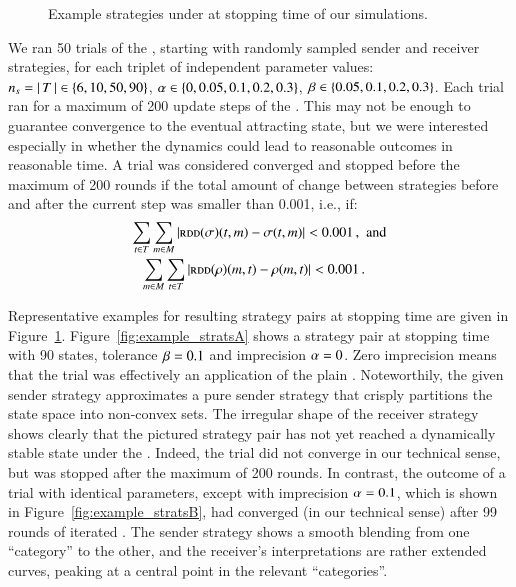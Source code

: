 \begin{figure}


  \caption{Example strategies under \rdd at stopping time of our simulations.}
  \label{fig:example_strats}
\end{figure}

We ran 50 trials of the \rdd, starting with randomly sampled sender
and receiver strategies, for each triplet of independent parameter
values: $n_s = \left \lvert \, T \, \right\rvert \in \left\{6, 10, 50, 90\right\}$, $\alpha \in
\left\{0, 0.05, 0.1, 0.2, 0.3\right\}$, $\beta \in \left\{0.05, 0.1, 0.2,
  0.3\right\}$. Each trial ran for a maximum of 200 update steps of the
\rdd. This may not be enough to guarantee convergence to the eventual
attracting state, but we were interested especially in whether the
dynamics could lead to reasonable outcomes in reasonable time. A trial
was considered converged and stopped before the maximum of 200 rounds
if the total amount of change between strategies before and after the
current \rdd step was smaller than 0.001, i.e., if:
\begin{align*}
  \sum_{t \in T} \sum_{m \in M} \left|
    \textsc{rdd}(\sigma)(t,m) - \sigma(t,m) \right| <
  0.001\,, & \text{\ \ and} \\
  \sum_{m \in M} \sum_{t \in T} \left|
    \textsc{rdd}(\rho)(m,t) - \rho(m,t) \right| <
  0.001 & \,.
\end{align*}

Representative examples for resulting strategy pairs at stopping time
are given in
Figure~\ref{fig:example_strats}. Figure~\ref{fig:example_stratsA}
shows a strategy pair at stopping time with 90 states, tolerance
$\beta = 0.1$ and imprecision $\alpha = 0$. Zero imprecision
means that the trial was effectively an application of the plain
\rd. Noteworthily, the given sender strategy approximates a pure
sender strategy that crisply partitions the state space into
non-convex sets. The irregular shape of the receiver strategy shows
clearly that the pictured strategy pair has not yet reached a
dynamically stable state under the \rd. Indeed, the trial did not
converge in our technical sense, but was stopped after the maximum of
200 rounds. In contrast, the outcome of a trial with identical
parameters, except with imprecision $\alpha = 0.1$, which is
shown in Figure~\ref{fig:example_stratsB}, had converged (in our
technical sense) after 99 rounds of iterated \rdd. The sender strategy
shows a smooth blending from one ``category'' to the other, and the
receiver's interpretations are rather extended curves, peaking at a
central point in the relevant ``categories''. 

